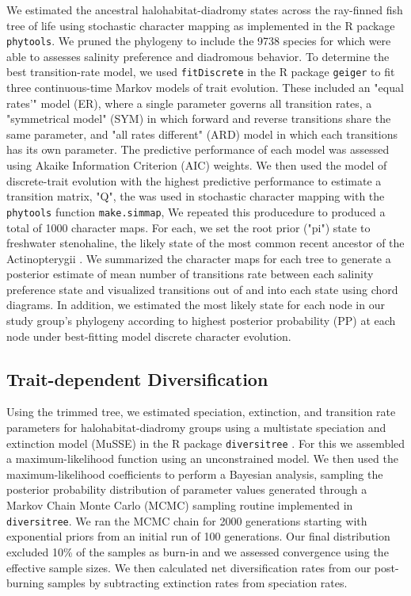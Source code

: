 \documentclass[11pt]{article}
\begin{document}
We estimated the ancestral halohabitat-diadromy states across the ray-finned fish tree of life using stochastic character mapping \citep{bollback2006simmap} as  implemented in the R package  \texttt{phytools}. We pruned the phylogeny to include the 9738 species for which were able to assesses salinity preference and diadromous behavior. To determine the best transition-rate model, we used \texttt{fitDiscrete} in the R package  \texttt{geiger} to fit three continuous-time Markov models of trait evolution. These included an "equal rates'" model (ER),  where a single parameter governs all transition rates, a "symmetrical model" (SYM) in which forward and reverse transitions share the same parameter, and "all rates different" (ARD) model in which each transitions has its own parameter. The predictive performance of each model was assessed using Akaike Information Criterion (AIC) weights. We then used the model of discrete-trait evolution with the highest predictive performance to estimate a transition matrix, "Q", the was used in stochastic character mapping with the  \texttt{phytools} function \texttt{make.simmap}, We repeated this producedure to produced a total of 1000 character maps. For each, we set the root prior ("pi") state to freshwater stenohaline, the likely state of the most common recent ancestor of the Actinopterygii \citep{betancur2015fossil,carrete2012there,schultz2012euryhalinity,evans2008}. We summarized the character maps for each tree to generate a posterior estimate of mean number of transitions rate between each salinity preference state and visualized transitions out of and into each state using chord diagrams. In addition, we estimated the most likely state for each node in our study group's phylogeny according to highest posterior probability (PP) at each node under best-fitting model discrete character evolution. 

\subsection*{Trait-dependent Diversification}

Using the trimmed \citep{rabosky2018inverse} tree, we estimated speciation, extinction, and transition rate parameters for halohabitat-diadromy groups using a multistate speciation and extinction model (MuSSE) in the R package  \texttt{diversitree} \citep{fitzjohn2012diversitree}. For this we assembled a  maximum-likelihood function using an unconstrained model. We then used the maximum-likelihood coefficients to perform a Bayesian analysis, sampling the posterior probability distribution of parameter values generated through a Markov Chain Monte Carlo (MCMC) sampling routine implemented in  \texttt{diversitree}. We ran the MCMC chain for 2000 generations starting with exponential priors from an initial run of 100 generations. Our final distribution excluded 10\% of the samples as burn-in and we assessed convergence using the effective sample sizes. We then calculated net diversification rates from our post-burning samples by subtracting extinction rates from speciation rates.
\end{document}
